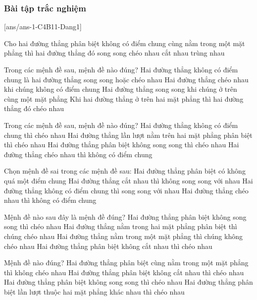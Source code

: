 \subsubsection{Bài tập trắc nghiệm}
[ans/ans-1-C4B11-Dang1]
\begin{ex}%
	Cho hai đường thẳng phân biệt không có điểm chung cùng nằm trong một mặt phẳng thì hai đường thẳng đó
	\choice
	{\True song song}
	{chéo nhau}
	{cắt nhau}
	{trùng nhau}
	\loigiai{
	}
\end{ex}
\begin{ex}%
	Trong các mệnh đề sau, mệnh đề nào đúng?
	\choice
	{\True Hai đường thẳng không có điểm chung là hai đường thẳng song song hoặc chéo nhau}
	{Hai đường thẳng chéo nhau khi chúng không có điểm chung}
	{Hai đường thẳng song song khi chúng ở trên cùng một mặt phẳng}
	{Khi hai đường thẳng ở trên hai mặt phẳng thì hai đường thẳng đó chéo nhau}
	\loigiai{
	}
\end{ex}
\begin{ex}%
	Trong các mệnh đề sau, mệnh đề nào đúng?
	\choice
	{Hai đường thẳng không có điểm chung thì chéo nhau}
	{Hai đường thẳng lần lượt nằm trên hai mặt phẳng phân biệt thì chéo nhau}
	{Hai đường thẳng phân biệt không song song thì chéo nhau}
	{\True Hai đường thẳng chéo nhau thì không có điểm chung}
	\loigiai{
	}
\end{ex}
\begin{ex}%
	Chọn mệnh đề sai trong các mệnh đề sau:
	\choice
	{Hai đường thẳng phân biệt có không quá một điểm chung}
	{Hai đường thẳng cắt nhau thì không song song với nhau}
	{\True Hai đường thẳng không có điểm chung thì song song với nhau}
	{Hai đường thẳng chéo nhau thì không có điểm chung}
	\loigiai{
	}
\end{ex}
\begin{ex}%
	Mệnh đề nào sau đây là mệnh đề đúng?
	\choice
	{Hai đường thẳng phân biệt không song song thì chéo nhau}
	{Hai đường thẳng nằm trong hai mặt phẳng phân biệt thì chúng chéo nhau}
	{\True Hai đường thẳng nằm trong một mặt phẳng thì chúng không chéo nhau}
	{Hai đường thẳng phân biệt không cắt nhau thì chéo nhau}
	\loigiai{
	}
\end{ex}
\begin{ex}%
	Mệnh đề nào đúng?
	\choice
	{\True Hai đường thẳng phân biệt cùng nằm trong một mặt phẳng thì không chéo nhau}
	{Hai đường thẳng phân biệt không cắt nhau thì chéo nhau}
	{Hai đường thẳng phân biệt không song song thì chéo nhau}
	{Hai đường thẳng phân biệt lần lượt thuộc hai mặt phẳng khác nhau thì chéo nhau}
	\loigiai{
	}
\end{ex}

